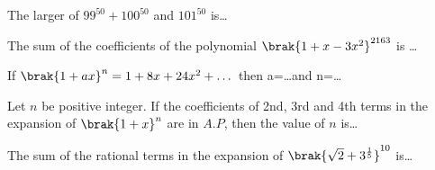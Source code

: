 \iffalse
\title{Assignment 1}
\author{AI24BTECH11020 - RISHIKA K}
\section{fitb}
\fi

\item The larger of $99^{50}+100^{50}$ and $101^{50}$ is\dots \hfill {}
\item The sum of the coefficients of the polynomial $\brak{1+x-3x^2}^{2163}$ is \dots \hfill {}
\item If $\brak{1+ax}^n=1+8x+24x^2+\dots$ then a=\dots and n=\dots
	\hfill {}
\item Let $n$ be positive integer. If the coefficients of 2nd, 3rd and 4th terms in the expansion of $\brak{1 + x}^n$ are in $A.P$, then the value of $n$ is\dots	\hfill {}
\item The sum of the rational terms in the expansion of $\brak{\sqrt{2}+3^\frac{1}{5}}^{10}$ is\dots
	\hfill {}

